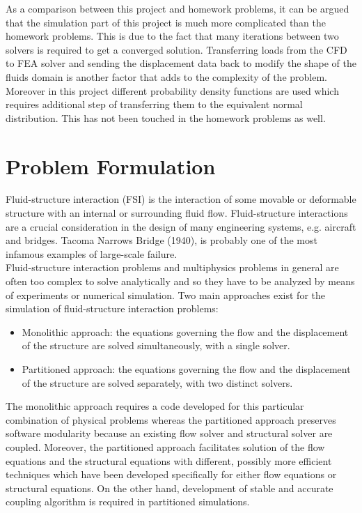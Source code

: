 \documentclass[paper=a4, fontsize=12pt]{scrartcl} %
\begin{document}
As a comparison between this project and homework problems, it can be argued that the simulation part of this project is much more complicated than the homework problems. This is due to the fact that many iterations between two solvers is required to get a converged solution. Transferring loads from the CFD to FEA solver and sending the displacement data back to modify the shape of the fluids domain is another factor that adds to the complexity of the problem. Moreover in this project different probability density functions are used which requires additional step of transferring them to the equivalent normal distribution. This has not been touched in the homework problems as well.
\section{Problem Formulation}\label{sec:problemFormulation}
Fluid-structure interaction (FSI) is the interaction of some movable or deformable structure with an internal or surrounding fluid flow. Fluid-structure interactions are a crucial consideration in the design of many engineering systems, e.g. aircraft and bridges. Tacoma Narrows Bridge (1940), is probably one of the most infamous examples of large-scale failure.\\

Fluid-structure interaction problems and multiphysics problems in general are often too complex to solve analytically and so they have to be analyzed by means of experiments or numerical simulation. Two main approaches exist for the simulation of fluid-structure interaction problems:
%
\begin{itemize}
	\item Monolithic approach: the equations governing the flow and the 
		displacement of the structure are solved simultaneously, with a single 
		solver.
	\item Partitioned approach: the equations governing the flow and the 
		displacement of the structure are solved separately, with two distinct 
		solvers.
\end{itemize}
%
The monolithic approach requires a code developed for this particular combination of physical problems whereas the partitioned approach preserves software modularity because an existing flow solver and structural solver are coupled. Moreover, the partitioned approach facilitates solution of the flow equations and the structural equations with different, possibly more efficient techniques which have been developed specifically for either flow equations or structural equations. On the other hand, development of stable and accurate coupling algorithm is required in partitioned simulations.\\
\end{document}
